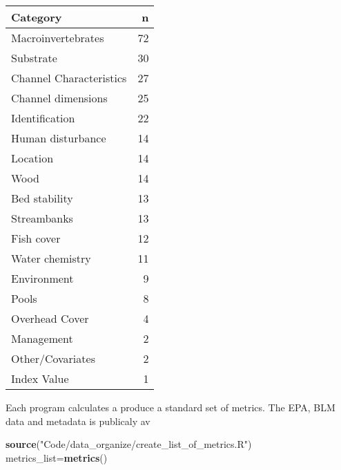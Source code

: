 \documentclass[]{article}
\newenvironment{Shaded}{\begin{snugshade}}{\end{snugshade}}
\newcommand{\CommentTok}[1]{\textcolor[rgb]{0.56,0.35,0.01}{\textit{#1}}}
\newcommand{\DataTypeTok}[1]{\textcolor[rgb]{0.13,0.29,0.53}{#1}}
\newcommand{\DecValTok}[1]{\textcolor[rgb]{0.00,0.00,0.81}{#1}}
\newcommand{\KeywordTok}[1]{\textcolor[rgb]{0.13,0.29,0.53}{\textbf{#1}}}
\newcommand{\NormalTok}[1]{#1}
\newcommand{\OperatorTok}[1]{\textcolor[rgb]{0.81,0.36,0.00}{\textbf{#1}}}
\newcommand{\OtherTok}[1]{\textcolor[rgb]{0.56,0.35,0.01}{#1}}
\newcommand{\StringTok}[1]{\textcolor[rgb]{0.31,0.60,0.02}{#1}}
\begin{document}
\begin{Shaded}
\end{Shaded}

\begin{tabular}{l|r}
\hline
Category & n\\
\hline
Macroinvertebrates & 72\\
\hline
Substrate & 30\\
\hline
Channel Characteristics & 27\\
\hline
Channel dimensions & 25\\
\hline
Identification & 22\\
\hline
Human disturbance & 14\\
\hline
Location & 14\\
\hline
Wood & 14\\
\hline
Bed stability & 13\\
\hline
Streambanks & 13\\
\hline
Fish cover & 12\\
\hline
Water chemistry & 11\\
\hline
Environment & 9\\
\hline
Pools & 8\\
\hline
Overhead Cover & 4\\
\hline
Management & 2\\
\hline
Other/Covariates & 2\\
\hline
Index Value & 1\\
\hline
\end{tabular}

Each program calculates a produce a standard set of metrics. The EPA,
BLM data and metadata is publicaly av

\begin{Shaded}
\begin{Highlighting}[]
\KeywordTok{source}\NormalTok{(}\StringTok{"Code/data_organize/create_list_of_metrics.R"}\NormalTok{)}
\NormalTok{metrics_list=}\KeywordTok{metrics}\NormalTok{()}
\end{Highlighting}
\end{Shaded}
\end{document}
